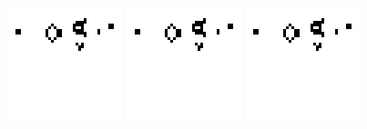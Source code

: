 \documentclass[a4paper,12pt,twoside]{article}
\begin{document}
\begin{figure}[htb]
  \begin{center}
      \includegraphics[width=.75\textwidth]{test1.png}
      \includegraphics[width=.75\textwidth]{test1.png}
      \includegraphics[width=.75\textwidth]{test1.png}

\end{center}
\end{figure}
\end{document}

